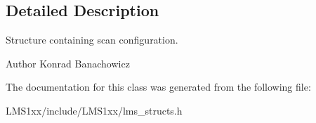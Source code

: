 \subsection{Detailed Description}
Structure containing scan configuration. 

\begin{DoxyAuthor}{Author}
Konrad Banachowicz 
\end{DoxyAuthor}


The documentation for this class was generated from the following file\+:\begin{DoxyCompactItemize}
\item 
L\+M\+S1xx/include/\+L\+M\+S1xx/lms\+\_\+structs.\+h\end{DoxyCompactItemize}
